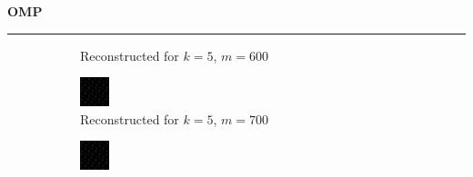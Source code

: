 \documentclass[a4paper,12pt]{article}
\newenvironment{solution}[2][]{%
    \begin{mdframed}[linecolor=blue!70!black, linewidth=2pt, roundcorner=10pt, backgroundcolor=yellow!10!white, skipabove=12pt, skipbelow=12pt]%
        \textbf{\large #2}
        \par\noindent\rule{\textwidth}{0.4pt}
}{
    \end{mdframed}
}
\begin{document}
\begin{solution}{OMP}
\begin{figure}[H]
\begin{subfigure}[t]{0.23\textwidth}
        \caption{Reconstructed for $k = 5$, $m = 600$}
    \end{subfigure}
    \begin{subfigure}[t]{0.23\textwidth}
        \centering
        \includegraphics[width=\textwidth]{../images/omp/Reconstructed_k_5_m_700.png}
        \caption{Reconstructed for $k = 5$, $m = 700$}
    \end{subfigure}
    \begin{subfigure}[t]{0.23\textwidth}
        \centering
        \includegraphics[width=\textwidth]{../images/omp/Reconstructed_k_5_m_800.png}

\end{subfigure}
\end{figure}
\end{solution}
\end{document}
